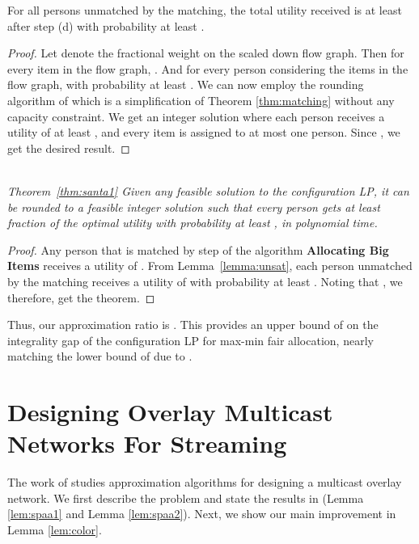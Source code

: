 \begin{lemma}
\label{lemma:unsat}
For all persons unmatched by the matching, the total utility received is at least  after step (d) with probability at least .
\end{lemma}
 \begin{proof}
 Let  denote the fractional weight on the scaled down flow graph. Then for every item  in the flow graph, . And for every person  considering the items in the flow graph,  with probability at least . We can now employ the rounding algorithm of \cite{dani:05} which is a simplification of Theorem \ref{thm:matching} without any capacity constraint. We get an integer solution where each person receives a utility of at least , and every item is assigned to at most one person. Since , we get the desired result.
\end{proof}
~\\
{\it Theorem~\ref{thm:santa1}
Given any feasible solution to the configuration LP, it can be rounded to a feasible integer solution such that every person gets  at least  fraction of the optimal utility with probability at least , in polynomial time.
}
\begin{proof}
Any person that is matched by step  of the algorithm {\bf Allocating Big Items} receives a utility of . From Lemma~\ref{lemma:unsat}, each person unmatched by the matching receives a utility of  with probability at least . Noting that , we therefore, get the theorem.
\end{proof}

Thus, our approximation ratio is .
This provides an upper bound of  on the integrality gap of the configuration LP for max-min fair allocation, nearly
matching the  lower bound of  due to \cite{bansal:stoc06}. 


\section{Designing Overlay Multicast Networks For Streaming}
\label{section:spaa}
The work of \cite{DBLP:conf/spaa/AndreevMMS03} studies approximation algorithms
for designing a multicast overlay network. We first describe the problem and state the results in \cite{DBLP:conf/spaa/AndreevMMS03} (Lemma \ref{lem:spaa1} and Lemma \ref{lem:spaa2}). Next, we show our main improvement in Lemma \ref{lem:color}.


